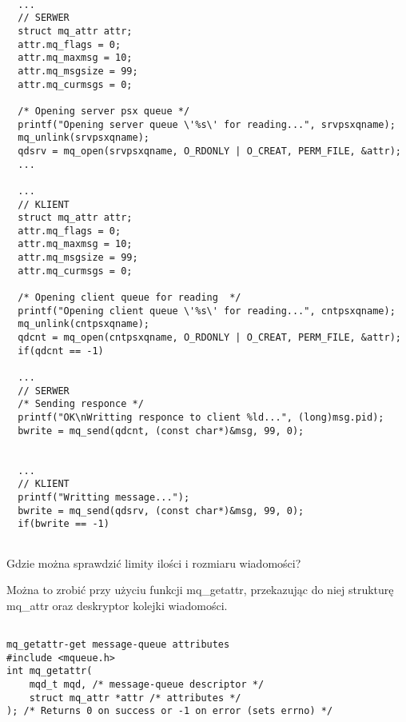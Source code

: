 \documentclass[a4paper,15pt]{article}
\newcommand{\ask}[2]{
    \begin{tcolorbox}[colback=black!5!white,colframe=gray,title={Pytanie #1}]
        #2
    \end{tcolorbox}
}
\begin{document}
\begin{lstlisting}[style=CStyle, label=some-code, caption=Poprawiony kod POSIX,
linebackgroundcolor={
	\ifnum\value{lstnumber}=13\color{gainsboro}\fi
	\ifnum\value{lstnumber}=27\color{gainsboro}\fi
	\ifnum\value{lstnumber}=34\color{gainsboro}\fi
	\ifnum\value{lstnumber}=40\color{gainsboro}\fi
	}
	]
	
  ...
  // SERWER
  struct mq_attr attr;
  attr.mq_flags = 0;
  attr.mq_maxmsg = 10;
  attr.mq_msgsize = 99;
  attr.mq_curmsgs = 0;
  
  /* Opening server psx queue */
  printf("Opening server queue \'%s\' for reading...", srvpsxqname);
  mq_unlink(srvpsxqname);
  qdsrv = mq_open(srvpsxqname, O_RDONLY | O_CREAT, PERM_FILE, &attr);  
  ...
  
  ...
  // KLIENT
  struct mq_attr attr;
  attr.mq_flags = 0;
  attr.mq_maxmsg = 10;
  attr.mq_msgsize = 99;
  attr.mq_curmsgs = 0;

  /* Opening client queue for reading  */
  printf("Opening client queue \'%s\' for reading...", cntpsxqname);
  mq_unlink(cntpsxqname);
  qdcnt = mq_open(cntpsxqname, O_RDONLY | O_CREAT, PERM_FILE, &attr);
  if(qdcnt == -1)
  
  ...
  // SERWER
  /* Sending responce */
  printf("OK\nWritting responce to client %ld...", (long)msg.pid);
  bwrite = mq_send(qdcnt, (const char*)&msg, 99, 0);  
  
  
  ...
  // KLIENT
  printf("Writting message...");
  bwrite = mq_send(qdsrv, (const char*)&msg, 99, 0);
  if(bwrite == -1)  
  

\end{lstlisting}



\ask{- Zadanie 2.3}{ 
Gdzie można sprawdzić limity ilości i rozmiaru wiadomości?
}

Można to zrobić przy użyciu funkcji mq\_getattr, przekazując do niej strukturę mq\_attr oraz deskryptor kolejki wiadomości. 

\begin{lstlisting}[style=CStyle, label=some-code,
linebackgroundcolor={
	\ifnum\value{lstnumber}=13\color{gainsboro}\fi
	\ifnum\value{lstnumber}=27\color{gainsboro}\fi
	\ifnum\value{lstnumber}=34\color{gainsboro}\fi
	\ifnum\value{lstnumber}=40\color{gainsboro}\fi
	}
	]
	
mq_getattr-get message-queue attributes
#include <mqueue.h>
int mq_getattr( 
	mqd_t mqd, /* message-queue descriptor */ 
	struct mq_attr *attr /* attributes */ 
); /* Returns 0 on success or -1 on error (sets errno) */
\end{lstlisting}
\end{document}
